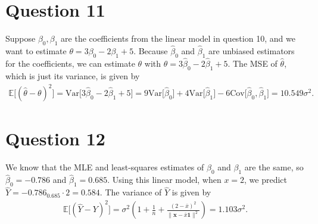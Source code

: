 \documentclass[10pt]{article}
\begin{document}
\section{Question 11} \noindent
Suppose \(\beta_0, \beta_1\) are the coefficients from the linear model in question 10, and we want to estimate \(\theta = 3 \beta_0 - 2 \beta_1 + 5\).
Because \(\hat{\beta}_0\) and \(\hat{\beta}_1\) are unbiased estimators for the coefficients, we can estimate \(\theta\)
with \(\hat{\theta} = 3 \hat{\beta}_0 - 2 \hat{\beta}_1 + 5\). The MSE of \(\hat{\theta}\), which is just its variance, is given by 
\begin{align*}
    \mathbb{E}\Big[ (\hat{\theta} - \theta)^2 \Big]
    = \mathrm{Var} \big[ 3 \hat{\beta}_0 - 2 \hat{\beta}_1 + 5 ] 
    = 9 \mathrm{Var}\big[ \hat{\beta}_0 \big] + 4 \mathrm{Var}\big[ \hat{\beta}_1 \big] - 6 \mathrm{Cov}\big[ \hat{\beta}_0, \hat{\beta}_1 \big]
    = 10.549 \sigma^2.
\end{align*}

\section{Question 12} \noindent
We know that the MLE and least-squares estimates of \(\beta_0\) and \(\beta_1\) are the same, so \(\hat{\beta}_0 = -0.786\) and \(\hat{\beta}_1 = 0.685\).
Using this linear model, when \(x = 2\), we predict \(\hat{Y} = -0.786 _ 0.685 \cdot 2 = 0.584\). The variance of \(\hat{Y}\) is given by 
\begin{align*}
    \mathbb{E} \Big[ (\hat{Y} - Y)^2 \Big]
    = \sigma^2 \left( 1 + \frac{1}{n} + \frac{(2 - \bar{x})^2}{\| \mathbf{x} - \bar{x}\mathbf{1} \|^2} \right)
    = 1.103 \sigma^2.
\end{align*}
\end{document}
